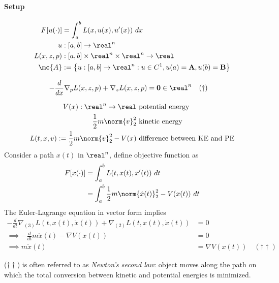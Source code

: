 \documentclass[11pt]{article}
\begin{document}
	\paragraph{Setup}
	\begin{align}
		F[u(\cdot)] &= \int_a^b L(x, u(x), u'(x))\ dx \\
		u &: [a, b] \to \real^n \\
		L(x, z, p) &: [a, b] \times \real^n \times \real^n \to \real \\
		\mc{A} &:= \left\{
			u: [a, b] \to \real^n: u \in C^1, u(a) = \textbf{A}, u(b) = \textbf{B}
		\right\} 
	\end{align}

	\begin{theorem}
		\begin{align}
			- \frac{d}{dx} \nabla_p L(x, z, p) + \nabla_z L(x, z, p) &= \textbf{0} \in \real^n \quad (\dagger)
		\end{align} 
	\end{theorem}
	
	\begin{example}
		\begin{align}
			V(x): \real^n \to \real &\text{ potential energy} \\
			\frac{1}{2} m \norm{v}_2^2 &\text{ kinetic energy} \\
			L(t, x, v):= \frac{1}{2} m \norm{v}_2^2 - V(x) &\text{ difference between KE and PE}
		\end{align}
		Consider a path $x(t)$ in $\real^n$, define objective function as
		\begin{align}
			F[x(\cdot)] &= \int_a^b L(t, x(t), x'(t))\ dt \\
			&= \int_a^b \frac{1}{2} m \norm{\dot{x}(t)}_2^2 - V(x(t))\ dt
		\end{align}
		The Euler-Lagrange equation in vector form implies
		\begin{align}
			- \frac{d}{dt} \nabla_{(3)} L(t, x(t), \dot{x}(t))
			+ \nabla_{(2)} L(t, x(t), \dot{x}(t)) &= 0 \\
			\implies - \frac{d}{dt} m \dot{x}(t) - \nabla V(x(t)) &= 0 \\
			\implies m \ddot{x}(t) &= \nabla V(x(t))\quad (\dagger \dagger)
		\end{align}
	\end{example}
	
	\begin{remark}
		($\dagger \dagger$) is often referred to as \emph{Newton's second law}: object moves along the path on which the total conversion between kinetic and potential energies is minimized.
	\end{remark}
	
\end{document}

